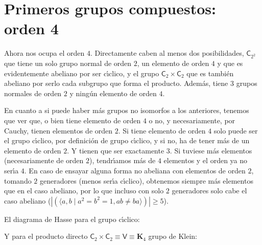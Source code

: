 \documentclass[final,12pt,a4paper,twoside,fleqn]{extbook}
\newcommand{\set}[1]{\ensuremath{\left\lbrace{#1}\right\rbrace}}
\newcommand{\grK}{\ensuremath{\mathbf{K}}}
\newcommand{\grclass}[1]{\ensuremath{\mathsf{#1}}}
\newcommand{\cyclicgr}[1]{\ensuremath{{\grclass{C}}_{#1}}}
\newcommand{\pd}[2]{\ensuremath{{#1}\!          \times          \!{#2}}}
\newcommand{\pdcyclics}[2]{\ensuremath{\pd{\cyclicgr{#1}}{\cyclicgr{#2}}}}
\theoremstyle{definition}
\theoremstyle{remark}
\begin{document}
\chapter{Primeros grupos compuestos: orden 4}

Ahora nos ocupa el orden $4$. Directamente caben al menos dos posibilidades, $\cyclicgr{2^2}$
que tiene un solo grupo normal de orden $2$, un elemento de orden $4$ y que es evidentemente
abeliano por ser c{\'{\i}}clico, y el grupo $\cyclicgr{2}      \times      \cyclicgr{2}$ que es tambi\'en
abeliano por serlo cada subgrupo que forma el producto. Adem\'as, tiene $3$ grupos normales
de orden $2$ y ning\'un elemento de orden $4$.

En cuanto a si puede haber m\'as grupos no isomorfos a los anteriores, tenemos que ver que,
o bien tiene elemento de orden $4$ o no, y necesariamente, por Cauchy, tienen elementos de
orden $2$. Si tiene elemento de orden $4$ solo puede ser el grupo c{\'{\i}}clico, por definici\'on
de grupo c{\'{\i}}clico, y si no, ha de tener m\'as de un elemento de orden $2$. Y tienen que ser
exactamente $3$. Si tuviese m\'as elementos (necesariamente de orden $2$), tendr{\'{\i}}amos m\'as
de $4$ elementos y el orden ya no ser{\'{\i}}a $4$. En caso de ensayar alguna forma no abeliana con
elementos de orden $2$, tomando $2$ generadores (menos ser{\'{\i}}a c{\'{\i}}clico), obtenemos
siempre m\'as elementos que en el caso abeliano, por lo que incluso con solo $2$ generadores solo
cabe el caso abeliano ($\left|\left(\langle a,b ∣a^2=b^2=1, ab        \neq        ba \rangle\right)\right|\geqslant 5$).

El diagrama de Hasse para el grupo c{\'{\i}}clico:

\begin{center}
\end{center}

Y para el producto directo $\pdcyclics{2}{2}       \equiv       \mathsf{V}       \equiv       \grK_{4}$ grupo de Klein:
\end{document}
